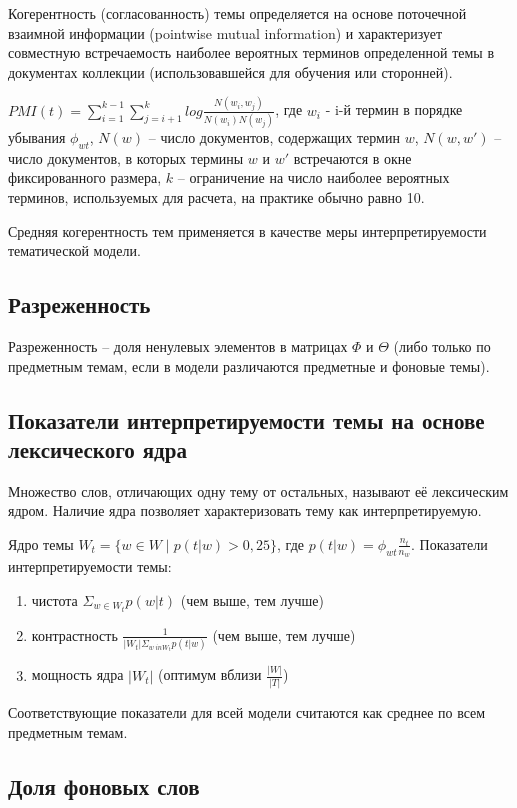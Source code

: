 Когерентность (согласованность) темы определяется на основе поточечной взаимной информации (pointwise mutual information) и характеризует совместную встречаемость наиболее вероятных терминов определенной темы в документах коллекции (использовавшейся для обучения или сторонней).

$PMI(t) = \sum_{i=1}^{k-1}\sum_{j=i+1}^{k}log\frac{N(w_i, w_j)}{N(w_i)N(w_j)}$, где $w_i$ - i-й термин в порядке убывания $\phi_{wt}$, $N(w)$ -- число документов, содержащих термин $w$, $N(w, w')$ -- число документов, в которых термины $w$ и $w'$ встречаются в окне фиксированного размера, $k$ -- ограничение на число наиболее вероятных терминов, используемых для расчета, на практике обычно равно 10.

Средняя когерентность тем применяется в качестве меры интерпретируемости тематической модели.

\subsection*{Разреженность}

Разреженность -- доля ненулевых элементов в матрицах $\Phi$ и $\Theta$ (либо только по предметным темам, если в модели различаются предметные и фоновые темы).

\subsection*{Показатели интерпретируемости темы на основе лексического ядра}

Множество слов, отличающих одну тему от остальных, называют её лексическим ядром. Наличие ядра позволяет характеризовать тему как интерпретируемую.

Ядро темы $W_t = \{w \in W \; | \; p(t|w) > 0,25\}$, где $p(t|w) = \phi_{wt}\frac{n_t}{n_w}$. Показатели интерпретируемости темы:
\begin{enumerate}
    \item чистота $\Sigma_{w \in W_t}p(w|t)$ (чем выше, тем лучше)
    \item контрастность $\frac{1}{|W_t|\Sigma_{w \ in W_t}p(t|w)}$ (чем выше, тем лучше)
    \item мощность ядра $|W_t|$ (оптимум вблизи $\frac{|W|}{|T|}$)
\end{enumerate} 

Соответствующие показатели для всей модели считаются как среднее по всем предметным темам.

\subsection*{Доля фоновых слов}

